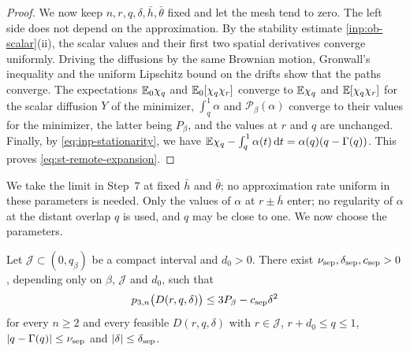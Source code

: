\begin{proof}
We now keep $n,r,q,\delta,\bar h,\bar\theta$ fixed and let the mesh tend to zero. The left side does not depend on the approximation. By the stability estimate \cref{inp:ob-scalar}(ii), the scalar values and their first two spatial derivatives converge uniformly. Driving the diffusions by the same Brownian motion, Gronwall's inequality and the uniform Lipschitz bound on the drifts show that the paths converge. The expectations $\mathbb E_0\chi_q$ and $\mathbb E_0[\chi_q\chi_r]$ converge to $\mathbb E\chi_q$ and $\mathbb E[\chi_q\chi_r]$ for the scalar diffusion $Y$ of the minimizer, $\int_q^1\alpha$ and $\mathcal P_\beta(\alpha)$ converge to their values for the minimizer, the latter being $P_\beta$, and the values at $r$ and $q$ are unchanged. Finally, by \eqref{eq:inp-stationarity}, we have $\mathbb E\chi_q-\int_q^1\alpha(t)\,\mathrm d t=\alpha(q)(q-\Gamma(q))$. This proves \eqref{eq:st-remote-expansion}.
\end{proof}

We take the limit in Step~7 at fixed $\bar h$ and $\bar\theta$; no approximation rate uniform in these parameters is needed. Only the values of $\alpha$ at $r\pm \bar h$ enter; no regularity of $\alpha$ at the distant overlap $q$ is used, and $q$ may be close to one. We now choose the parameters.

\begin{lemma}\label{lem:st-remote}
Let $\mathcal J\subset(0,q_\beta)$ be a compact interval and $d_0>0$. There exist $\nu_{\rm sep},\delta_{\rm sep},c_{\rm sep}>0$, depending only on $\beta$, $\mathcal J$ and $d_0$, such that
\begin{equation}\label{b:eq:remote-pressure-gap}
 p_{3,n}\bigl(D(r,q,\delta)\bigr)\le3P_\beta-c_{\rm sep}\delta^2
\end{equation}
for every $n\ge2$ and every feasible $D(r,q,\delta)$ with $r\in\mathcal J$, $r+d_0\le q\le1$, $\lvert q-\Gamma(q)\rvert\le\nu_{\rm sep}$ and $\lvert \delta\rvert\le\delta_{\rm sep}$.
\end{lemma}

